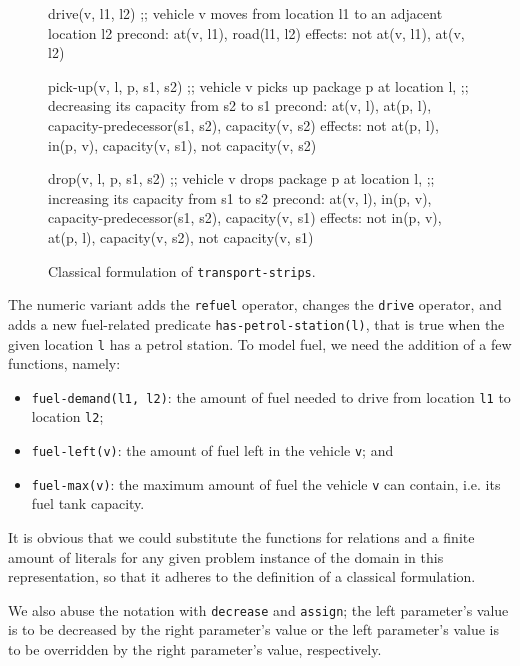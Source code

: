 \begin{figure}[htb]
\begin{code}
drive(v, l1, l2)
  ;; vehicle v moves from location l1 to an adjacent location l2
  precond: at(v, l1), road(l1, l2)
  effects: not at(v, l1), at(v, l2)

pick-up(v, l, p, s1, s2)
  ;; vehicle v picks up package p at location l,
  ;; decreasing its capacity from s2 to s1
  precond: at(v, l), at(p, l), capacity-predecessor(s1, s2),
           capacity(v, s2)
  effects: not at(p, l), in(p, v), capacity(v, s1),
           not capacity(v, s2)
  
drop(v, l, p, s1, s2)
  ;; vehicle v drops package p at location l,
  ;; increasing its capacity from s1 to s2
  precond: at(v, l), in(p, v), capacity-predecessor(s1, s2),
           capacity(v, s1)
  effects: not in(p, v), at(p, l), capacity(v, s2),
           not capacity(v, s1)
\end{code}
\caption{Classical formulation of \texttt{transport-strips}.}
\label{code:classical-strips}
\end{figure}

The numeric variant  adds the \verb+refuel+ operator, changes the \verb+drive+
operator, and adds a new fuel-related predicate \verb+has-petrol-station(l)+, that is true when the given location \verb+l+ has
a petrol station.
To model fuel, we need the addition of a few functions, namely:

\begin{itemize}
\item \verb+fuel-demand(l1, l2)+: the amount of fuel needed to drive
from location \verb+l1+ to location \verb+l2+;
\item \verb+fuel-left(v)+: the amount of fuel left in
the vehicle \verb+v+; and
\item \verb+fuel-max(v)+: the maximum amount of fuel
the vehicle \verb+v+ can contain, i.e. its fuel tank capacity.
\end{itemize}

It is obvious that we could substitute the functions for relations
and a finite amount of literals for any given problem instance of
the domain in this representation,
so that it adheres to the definition of a classical formulation.

We also abuse the notation with \verb+decrease+ and \verb+assign+;
the left parameter's value is to be decreased by the right
parameter's value or the left parameter's value is to be overridden
by the right parameter's value, respectively.

